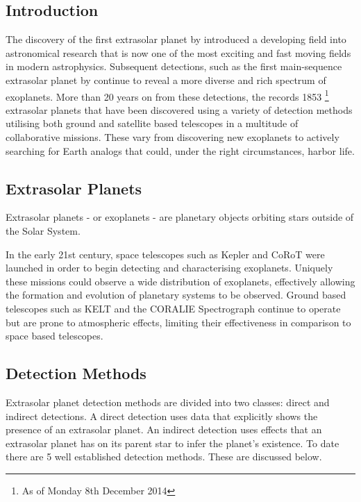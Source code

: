 \documentclass[twoside]{article}
\begin{document}
\begin{multicols}{2} %

\section{Introduction}
The discovery of the first extrasolar planet by \cite{first} introduced a developing field into astronomical research that is now one of the most exciting and fast moving fields in modern astrophysics. Subsequent detections, such as the first main-sequence extrasolar planet by \cite{MQ} continue to reveal a more diverse and rich spectrum of exoplanets. More than 20 years on from these detections, the \cite{exo} records 1853 \footnote{As of Monday 8th December 2014} extrasolar planets that have been discovered using a variety of detection methods utilising both ground and satellite based telescopes in a multitude of collaborative missions. These vary from discovering new exoplanets to actively searching for Earth analogs that could, under the right circumstances, harbor life.

\subsection{Extrasolar Planets}
Extrasolar planets - or exoplanets - are planetary objects orbiting stars outside of the Solar System.  

In the early 21st century, space telescopes such as Kepler and CoRoT were launched in order to begin detecting and characterising exoplanets. Uniquely these missions could observe a wide distribution of exoplanets, effectively allowing the formation and evolution of planetary systems to be observed. Ground based telescopes such as KELT and the CORALIE Spectrograph continue to operate but are prone to atmospheric effects, limiting their effectiveness in comparison to space based telescopes.

\subsection{Detection Methods}
Extrasolar planet detection methods are divided into two classes: direct and indirect detections. A direct detection uses data that explicitly shows the presence of an extrasolar planet. An indirect detection uses effects that an extrasolar planet has on its parent star to infer the planet's existence. To date there are 5 well established detection methods. These are discussed below.  


\end{multicols}
\end{document}
